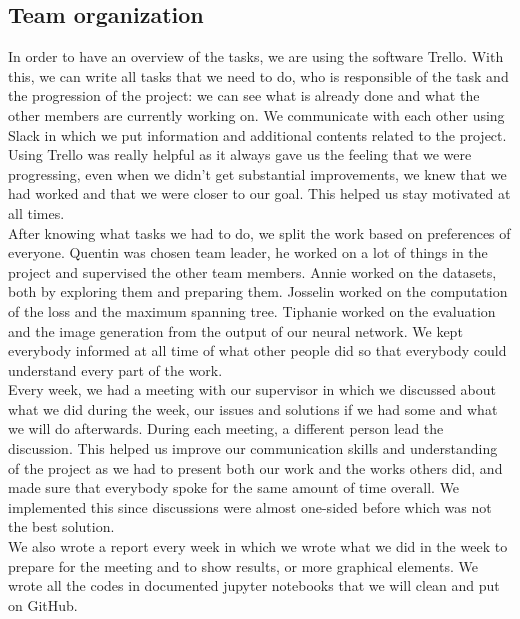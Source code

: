 \subsection{Team organization}

In order to have an overview of the tasks, we are using the software Trello.
With this, we can write all tasks that we need to do, who is responsible of
the task and the progression of the project: we can see what is already done
and what the other members are currently working on. We communicate with each
other using Slack in which we put information and additional contents related
to the project. \\
Using Trello was really helpful as it always gave us the feeling that we were
progressing, even when we didn't get substantial improvements, we knew that we
had worked and that we were closer to our goal. This helped us stay motivated
at all times.\\

After knowing what tasks we had to do, we split the work based on preferences of
everyone. Quentin was chosen team leader, he worked on a lot of things in the
project and supervised the other team members. Annie worked on the datasets,
both by exploring them and preparing them.
Josselin worked on the computation of the loss and the maximum spanning tree.
Tiphanie worked on the evaluation and the image generation from the output of
our neural network.
We kept everybody informed at all time of what other people did so that
everybody could understand every part of the work.\\

Every week, we had a meeting with our supervisor in which we discussed about
what we did during the week, our issues and solutions if we had some and what
we will do afterwards. During each meeting, a different person lead the
discussion. This helped us improve our communication skills and understanding
of the project as we had to
present both our work and the works others did, and made sure that everybody
spoke for the same amount of time overall. We implemented this since
discussions were almost one-sided before which was not the best solution.\\

We also wrote a report every week in which we wrote what we did in
the week to prepare for the meeting and to show results, or more graphical
elements. We wrote all the codes in documented jupyter notebooks that we will clean and put on GitHub. \\

